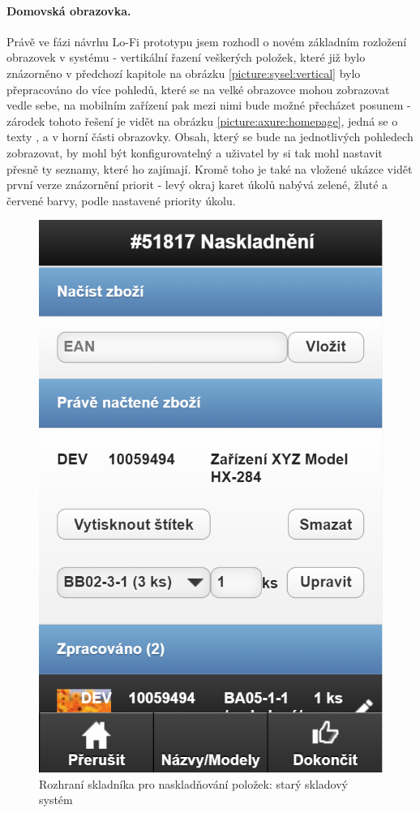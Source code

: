 \paragraph{Domovská obrazovka.} Právě ve fázi návrhu Lo-Fi prototypu jsem rozhodl o novém základním rozložení obrazovek v systému - vertikální řazení veškerých položek, které již bylo znázorněno v předchozí kapitole na obrázku \ref{picture:sysel:vertical} bylo přepracováno do více pohledů, které se na velké obrazovce mohou zobrazovat vedle sebe, na mobilním zařízení pak mezi nimi bude možné přecházet posunem - zárodek tohoto řešení je vidět na obrázku \ref{picture:axure:homepage}, jedná se o texty ,  a  v horní části obrazovky. Obsah, který se bude na jednotlivých pohledech zobrazovat, by mohl být konfigurovatelný a uživatel by si tak mohl nastavit přesně ty seznamy, které ho zajímají. Kromě toho je také na vložené ukázce vidět první verze znázornění priorit - levý okraj karet úkolů nabývá zelené, žluté a červené barvy, podle nastavené priority úkolu.

\begin{figure}[h]
\includegraphics[height=0.6\textheight]{../png/sysel/naskladneni.png}
\caption{Rozhraní skladníka pro naskladňování položek: starý skladový systém} \label{picture:sysel:naskladneni}
\end{figure}

